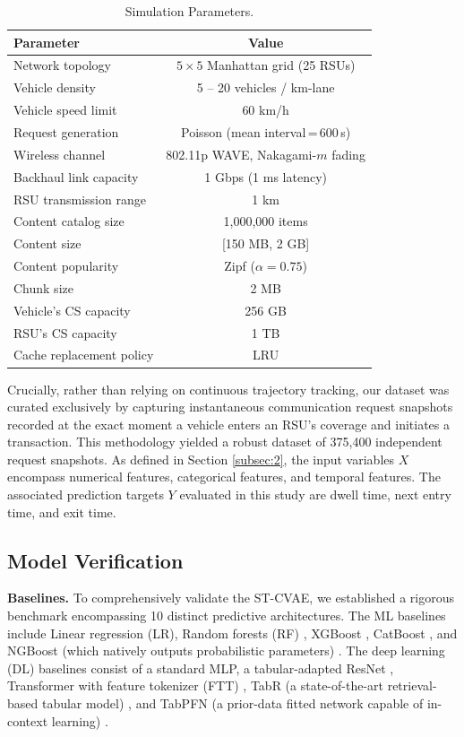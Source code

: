 \documentclass[journal]{IEEEtran}
\begin{document}
\begin{table}[ht]\centering
    \caption{Simulation Parameters.}
    \begin{tabular}{lc}
        \hline
        \textbf{Parameter} & \textbf{Value} \\
        \hline
        Network topology & $5 \times 5$ Manhattan grid (25 RSUs) \\
        Vehicle density & 5 -- 20 vehicles / km-lane \\
        Vehicle speed limit & 60 km/h \\
        Request generation & Poisson (mean interval\,=\,600\,s) \\
        Wireless channel & 802.11p WAVE, Nakagami-$m$ fading \\
        Backhaul link capacity & 1 Gbps (1 ms latency) \\
        RSU transmission range & 1 km \\
        Content catalog size & 1,000,000 items \\
        Content size & [150 MB, 2 GB] \\
        Content popularity & Zipf ($\alpha=0.75$) \\
        Chunk size & 2 MB \\
        Vehicle's CS capacity & 256 GB \\
        RSU's CS capacity & 1 TB \\
        Cache replacement policy & LRU \\
        \hline
    \end{tabular}
    \label{table1}
\end{table}

Crucially, rather than relying on continuous trajectory tracking, our dataset was curated exclusively by capturing instantaneous communication request snapshots recorded at the exact moment a vehicle enters an RSU’s coverage and initiates a transaction.
This methodology yielded a robust dataset of 375,400 independent request snapshots.
As defined in Section \ref{subsec:2}, the input variables $X$ encompass numerical features, categorical features, and temporal features.
The associated prediction targets $Y$ evaluated in this study are dwell time, next entry time, and exit time.

\subsection{Model Verification} \label{sec.s1}
\textbf{Baselines.}
To comprehensively validate the ST-CVAE, we established a rigorous benchmark encompassing 10 distinct predictive architectures.
The ML baselines include Linear regression (LR), Random forests (RF) \cite{x2}, XGBoost \cite{x3}, CatBoost \cite{x4}, and NGBoost (which natively outputs probabilistic parameters) \cite{x5}. The deep learning (DL) baselines consist of a standard MLP, a tabular-adapted ResNet \cite{x6}, Transformer with feature tokenizer (FTT) \cite{x6}, TabR (a state-of-the-art retrieval-based tabular model) \cite{x7}, and TabPFN (a prior-data fitted network capable of in-context learning) \cite{x8}.
\end{document}

